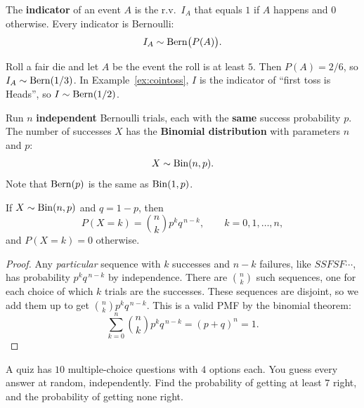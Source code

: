 \bigskip

\begin{definition}\label{def:indicator}
The \textbf{indicator} of an event $A$ is the r.v.\ $I_A$ that equals $1$ if $A$ happens and $0$ otherwise. Every indicator is Bernoulli:
\medskip
\[
I_A \sim \operatorname{Bern}\bigl(P(A)\bigr).
\]
\end{definition}

\bigskip

\begin{example}
Roll a fair die and let $A$ be the event the roll is at least $5$. Then $P(A) = 2/6$, so $I_A \sim \operatorname{Bern}(1/3)$. In Example~\ref{ex:cointoss}, $I$ is the indicator of ``first toss is Heads'', so $I \sim \operatorname{Bern}(1/2)$.
\end{example}

\bigskip

\begin{story}\label{story:bin}
Run $n$ \textbf{independent} Bernoulli trials, each with the \textbf{same} success probability $p$. The number of successes $X$ has the \textbf{Binomial distribution} with parameters $n$ and $p$:
\medskip
\[
X \sim \operatorname{Bin}(n, p).
\]
\medskip
Note that $\operatorname{Bern}(p)$ is the same as $\operatorname{Bin}(1, p)$.
\end{story}

\bigskip

\begin{theorem}\label{thm:binpmf}
If $X \sim \operatorname{Bin}(n, p)$ and $q = 1 - p$, then
\medskip
\[
P(X = k) = \binom{n}{k} p^{k} q^{\,n-k}, \qquad k = 0, 1, \dots, n,
\]
\medskip
and $P(X = k) = 0$ otherwise.
\end{theorem}

\medskip

\begin{proof}
Any \emph{particular} sequence with $k$ successes and $n - k$ failures, like $SSFSF\cdots$, has probability $p^{k}q^{\,n-k}$ by independence. There are $\binom{n}{k}$ such sequences, one for each choice of which $k$ trials are the successes. These sequences are disjoint, so we add them up to get $\binom{n}{k}p^{k}q^{\,n-k}$. This is a valid PMF by the binomial theorem:
\medskip
\[
\sum_{k=0}^{n} \binom{n}{k} p^{k} q^{\,n-k} = (p + q)^{n} = 1.
\]
\end{proof}

\bigskip

\begin{example}\label{ex:quiz}
A quiz has $10$ multiple-choice questions with $4$ options each. You guess every answer at random, independently. Find the probability of getting at least $7$ right, and the probability of getting none right.
\end{example}

